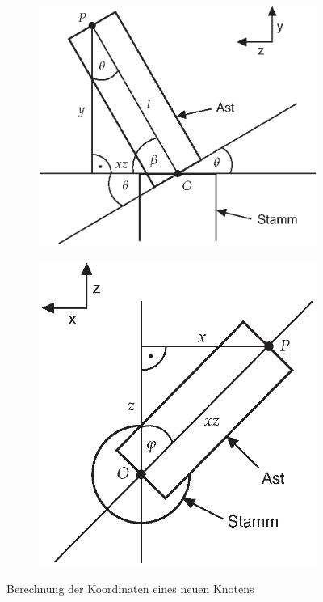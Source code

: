 \setlength{\fwidth}{.49\textwidth}
\begin{figure}[htb]
  \centering
  \begin{subfigure}[b]{\fwidth}
   \includegraphics[width=\textwidth]{figures/yz-plane}
    \label{fig:yz-plane}
  \end{subfigure}
  \hfill
  \begin{subfigure}[b]{\fwidth}
  	\includegraphics[width=\textwidth]{figures/xz-plane}
  	 \label{fig:xz-plane}
  \end{subfigure}
  \caption{Berechnung der Koordinaten eines neuen Knotens} \label{fig:node-calculation}
\end{figure}


